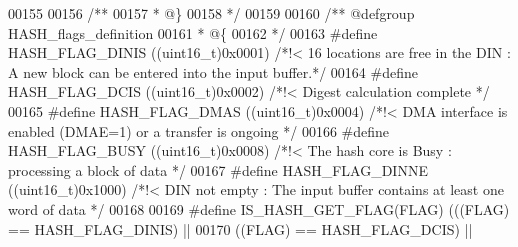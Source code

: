\begin{DoxyCode}
00155 
00156 \textcolor{comment}{/**}
00157 \textcolor{comment}{  * @\}}
00158 \textcolor{comment}{  */}
00159 
00160 \textcolor{comment}{/** @defgroup HASH\_flags\_definition   }
00161 \textcolor{comment}{  * @\{}
00162 \textcolor{comment}{  */}
00163 \textcolor{preprocessor}{#}\textcolor{preprocessor}{define} \textcolor{preprocessor}{HASH\_FLAG\_DINIS}            \textcolor{preprocessor}{(}\textcolor{preprocessor}{(}\textcolor{preprocessor}{uint16\_t}\textcolor{preprocessor}{)}0x0001\textcolor{preprocessor}{)}  \textcolor{comment}{/*!< 16 locations are free in the DIN : A new
       block can be entered into the input buffer.*/}
00164 \textcolor{preprocessor}{#}\textcolor{preprocessor}{define} \textcolor{preprocessor}{HASH\_FLAG\_DCIS}             \textcolor{preprocessor}{(}\textcolor{preprocessor}{(}\textcolor{preprocessor}{uint16\_t}\textcolor{preprocessor}{)}0x0002\textcolor{preprocessor}{)}  \textcolor{comment}{/*!< Digest calculation complete */}
00165 \textcolor{preprocessor}{#}\textcolor{preprocessor}{define} \textcolor{preprocessor}{HASH\_FLAG\_DMAS}             \textcolor{preprocessor}{(}\textcolor{preprocessor}{(}\textcolor{preprocessor}{uint16\_t}\textcolor{preprocessor}{)}0x0004\textcolor{preprocessor}{)}  \textcolor{comment}{/*!< DMA interface is enabled (DMAE=1) or a
       transfer is ongoing */}
00166 \textcolor{preprocessor}{#}\textcolor{preprocessor}{define} \textcolor{preprocessor}{HASH\_FLAG\_BUSY}             \textcolor{preprocessor}{(}\textcolor{preprocessor}{(}\textcolor{preprocessor}{uint16\_t}\textcolor{preprocessor}{)}0x0008\textcolor{preprocessor}{)}  \textcolor{comment}{/*!< The hash core is Busy : processing a block
       of data */}
00167 \textcolor{preprocessor}{#}\textcolor{preprocessor}{define} \textcolor{preprocessor}{HASH\_FLAG\_DINNE}            \textcolor{preprocessor}{(}\textcolor{preprocessor}{(}\textcolor{preprocessor}{uint16\_t}\textcolor{preprocessor}{)}0x1000\textcolor{preprocessor}{)}  \textcolor{comment}{/*!< DIN not empty : The input buffer contains
       at least one word of data */}
00168 
00169 \textcolor{preprocessor}{#}\textcolor{preprocessor}{define} \textcolor{preprocessor}{IS\_HASH\_GET\_FLAG}\textcolor{preprocessor}{(}\textcolor{preprocessor}{FLAG}\textcolor{preprocessor}{)} \textcolor{preprocessor}{(}\textcolor{preprocessor}{(}\textcolor{preprocessor}{(}\textcolor{preprocessor}{FLAG}\textcolor{preprocessor}{)} \textcolor{preprocessor}{==} HASH_FLAG_DINIS\textcolor{preprocessor}{)} \textcolor{preprocessor}{||}
00170                                 \textcolor{preprocessor}{(}\textcolor{preprocessor}{(}\textcolor{preprocessor}{FLAG}\textcolor{preprocessor}{)} \textcolor{preprocessor}{==} HASH_FLAG_DCIS\textcolor{preprocessor}{)}  \textcolor{preprocessor}{||}

\end{DoxyCode}
